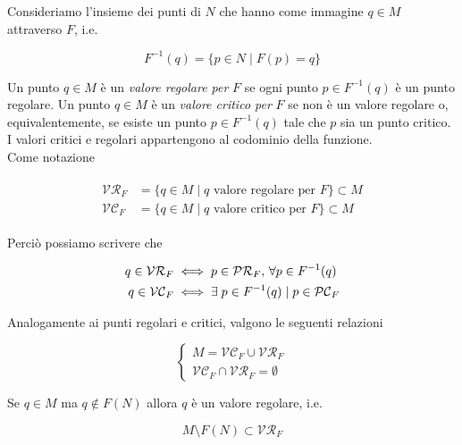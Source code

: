 Consideriamo l'insieme dei punti di $ N $ che hanno come immagine $ q \in M $ attraverso $ F $, i.e.

\begin{equation}
	F^{-1}(q) = \{ p \in N \mid F(p) = q \}
\end{equation}

Un punto $ q \in M $ è un \textit{valore regolare per} $ F $ se ogni punto $ p \in F^{-1}(q) $ è un punto regolare. Un punto $ q \in M $ è un \textit{valore critico per} $ F $ se non è un valore regolare o, equivalentemente, se esiste un punto $ p \in F^{-1}(q) $ tale che $ p $ sia un punto critico.\\
I valori critici e regolari appartengono al codominio della funzione.\\
Come notazione

\begin{align}
	\begin{split}
		\mathcal{VR}_{F} &= \{ q \in M \mid q \text{ valore regolare per } F \} \subset M\\
		\mathcal{VC}_{F} &= \{ q \in M \mid q \text{ valore critico per } F \} \subset M
	\end{split}
\end{align}

Perciò possiamo scrivere che

\begin{align}
	\begin{split}
		q \in \mathcal{VR}_{F} &\iff p \in \mathcal{PR}_{F}, \, \forall p \in F^{-1}(q)\\
		q \in \mathcal{VC}_{F} &\iff \exists \; p \in F^{-1}(q) \mid p \in \mathcal{PC}_{F}
	\end{split}
\end{align}

Analogamente ai punti regolari e critici, valgono le seguenti relazioni

\begin{equation}
	\begin{cases}
		M = \mathcal{VC}_{F} \cup \mathcal{VR}_{F}\\
		\mathcal{VC}_{F} \cap \mathcal{VR}_{F} = \emptyset
	\end{cases}
\end{equation}

\begin{remark}
	Se $ q \in M $ ma $ q \notin F(N) $ allora $ q $ è un valore regolare, i.e.
	
	\begin{equation}
		M \setminus F(N) \subset \mathcal{VR}_{F}
	\end{equation}
\end{remark}

